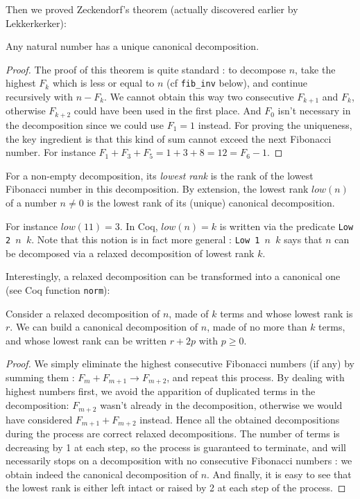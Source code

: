 \documentclass[a4paper,11pt]{article}
\begin{document}
Then we proved Zeckendorf's theorem (actually discovered earlier by Lekkerkerker):

\begin{theorem}[Zeckendorf]\label{zeck}
Any natural number has a unique canonical decomposition.
\end{theorem}

\begin{proof}
The proof of this theorem is quite standard : to decompose
$n$, take the highest $F_k$ which is less or equal to $n$
(cf {\tt fib\_inv} below),
and continue recursively with $n-F_k$. We cannot obtain this way
two consecutive $F_{k+1}$ and $F_k$, otherwise $F_{k+2}$ could have
been used in the first place. And $F_0$ isn't necessary in the
decomposition since we could use $F_1 = 1$ instead.
For proving the uniqueness, the key ingredient is that this kind of
sum cannot exceed the next Fibonacci number. For instance
$F_1+F_3+F_5 = 1+3+8 = 12 = F_6 - 1$.
\end{proof}

\begin{definition}
For a non-empty decomposition, its \emph{lowest rank} is the rank of
the lowest Fibonacci number in this decomposition. By extension,
the lowest rank $low(n)$ of a number $n\neq 0$ is the lowest
rank of its (unique) canonical decomposition.
\end{definition}
For instance $low(11)=3$. In Coq, $low(n)=k$ is written
via the predicate {\tt Low 2 $n$ $k$}. Note that this notion is
in fact more general : {\tt Low 1 $n$ $k$} says that $n$ can be
decomposed via a relaxed decomposition of lowest rank $k$.

Interestingly, a relaxed decomposition can be transformed into
a canonical one (see Coq function {\tt norm}):

\begin{theorem}[normalization]\label{norm}
Consider a relaxed decomposition of $n$, made of $k$ terms and
whose lowest rank is $r$. We can build a canonical decomposition
of $n$, made of no more than $k$ terms, and whose lowest rank can
be written $r+2p$ with $p\ge 0$.  
\end{theorem}
\begin{proof}
We simply eliminate the highest consecutive Fibonacci numbers (if any)
by summing them : $F_m+F_{m+1} \to F_{m+2}$, and repeat this
process. By dealing with highest numbers first, we avoid the apparition of
duplicated terms in the decomposition: $F_{m+2}$ wasn't already
in the decomposition, otherwise we would have considered
$F_{m+1}+F_{m+2}$ instead. Hence all the obtained decompositions
during the process are correct relaxed decompositions. The number of
terms is decreasing by 1 at each step, so the process is guaranteed to
terminate, and will necessarily stops on a decomposition with no
consecutive Fibonacci numbers : we obtain indeed the canonical
decomposition of $n$. And finally, it is easy to see that the
lowest rank is either left intact or raised by 2 at each step
of the process.
\end{proof}
\end{document}
